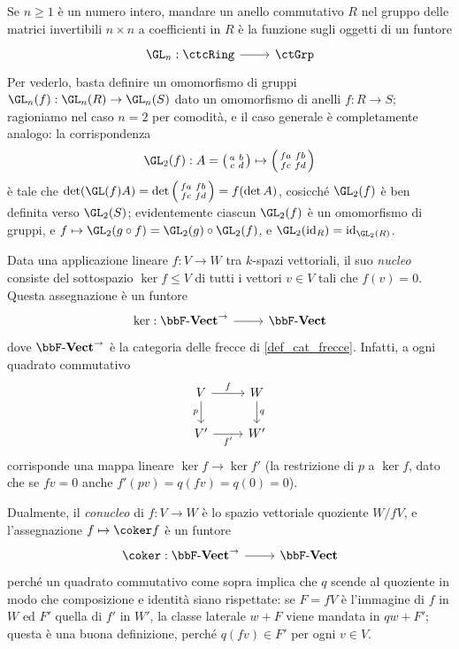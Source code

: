\begin{example}\label{ex_fun_GLn}
	Se \(n\ge 1\) è un numero intero, mandare un anello commutativo \(R\) nel gruppo delle matrici invertibili \(n\times n\) a coefficienti in \(R\) è la funzione sugli oggetti di un funtore
	\[\dmFun{\GL_n}\ctcRing\ctGrp\]
	Per vederlo, basta definire un omomorfismo di gruppi \(\GL_n(f) : \GL_n(R)\to \GL_n(S)\) dato un omomorfismo di anelli \(f : R\to S\); ragioniamo nel caso \(n=2\) per comodità, e il caso generale è completamente analogo: la corrispondenza
	\[\GL_2(f) : A=\left(\begin{smallmatrix}
				a	&	b \\
				c	&	d
			\end{smallmatrix}\right)
		\mapsto
		\left(\begin{smallmatrix}
				fa	&	fb \\
				fc	&	fd
			\end{smallmatrix}\right)
	\]
	è tale che \(\det(\GL(f)A)=\det\left(\begin{smallmatrix}		fa	&	fb \\		fc	&	fd	\end{smallmatrix}\right) = f(\det A)\), cosicché \(\GL_2(f)\) è ben definita verso \(\GL_2(S)\); evidentemente ciascun \(\GL_2(f)\) è un omomorfismo di gruppi, e \(f\mapsto\GL_2(g\cmp f) = \GL_2(g)\cmp\GL_2(f)\), e \(\GL_2(\id_R) = \id_{\GL_2(R)}\).
\end{example}
\begin{example}\label{ker_e_coker}
	Data una applicazione lineare \(f : V\to W\) tra \(k\)-spazi vettoriali, il suo \emph{nucleo} consiste del sottospazio \(\ker f\le V\) di tutti i vettori \(v\in V\) tali che \(f(v)=0\). Questa assegnazione è un funtore
	\[\dmFun{\ker}{\ctVect^\to}\ctVect\]
	dove \(\ctVect^\to\) è la categoria delle frecce di \ref{def_cat_frecce}. Infatti, a ogni quadrato commutativo
	\[\begin{tikzcd}
			V \ar[r, "f"]\ar[d, "p"']& W\ar[d, "q"] \\
			V' \ar[r, "{f'}"'] & W'
		\end{tikzcd}\]
	corrisponde una mappa lineare \(\ker f \to \ker f'\) (la restrizione di \(p\) a \(\ker f\), dato che se \(fv=0\) anche \(f'(pv)=q(fv)=q(0)=0\)).

	Dualmente, il \emph{conucleo} di \(f : V\to W\) è lo spazio vettoriale quoziente \(W/fV\), e l'assegnazione \(f\mapsto \coker f\) è un funtore
	\[\dmFun{\coker}{\ctVect^\to}\ctVect\]
	perché un quadrato commutativo come sopra implica che \(q\) scende al quoziente in modo che composizione e identità siano rispettate: se \(F = fV\) è l'immagine di \(f\) in \(W\) ed \(F'\) quella di \(f'\) in \(W'\), la classe laterale \(w + F\) viene mandata in \(qw+F'\); questa è una buona definizione, perché \(q(fv) \in F'\) per ogni \(v\in V\).
\end{example}
